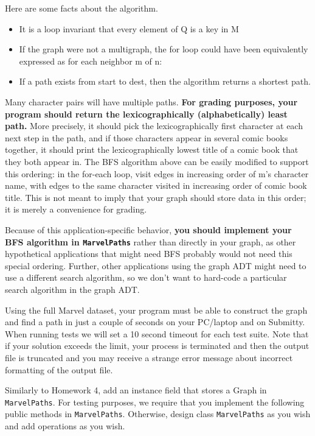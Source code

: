 \documentclass[11pt]{article}
\begin{document}
\newpage

Here are some facts about the algorithm.
\begin{itemize}
    \item It is a loop invariant that every element of Q is a key in M
\item If the graph were not a multigraph, the for loop could have been equivalently expressed as for each neighbor m of n:
\item If a path exists from start to dest, then the algorithm returns a shortest path.
\end{itemize}

\noindent Many character pairs will have multiple paths. \textbf{For grading purposes, your program should return the lexicographically (alphabetically) least path.} More precisely, it should pick the lexicographically first character at each next step in the path, and if those characters appear in several comic books together, it should print the lexicographically lowest title of a comic book that they both appear in. The BFS algorithm above can be easily modified to support this ordering: in the for-each loop, visit edges in increasing order of m's character name, with edges to the same character visited in increasing order of comic book title. This is not meant to imply that your graph should store data in this order; it is merely a convenience for grading.

\noindent Because of this application-specific behavior, \textbf{you should implement your BFS algorithm in \texttt{MarvelPaths}} rather than directly in your graph, as other hypothetical applications that might need BFS probably would not need this special ordering. Further, other applications using the graph ADT might need to use a different search algorithm, so we don't want to hard-code a particular search algorithm in the graph ADT.

\noindent Using the full Marvel dataset, your program must be able to construct the graph and find a path in just a couple of seconds on your PC/laptop and on Submitty. When running tests we will set a 10 second timeout for each test suite. Note that if your solution exceeds the limit, your process is terminated and then the output file is truncated and you may receive a strange error message about incorrect formatting of the output file.

\noindent Similarly to Homework 4, add an instance field that stores a Graph in \texttt{MarvelPaths}. For testing purposes, we require that you implement the following public methods in \texttt{MarvelPaths}. Otherwise, design class \texttt{MarvelPaths} as you wish and add operations as you wish.
\end{document}
